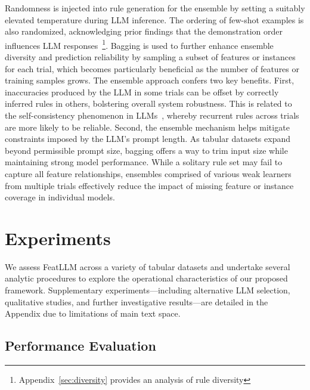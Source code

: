 Randomness is injected into rule generation for the ensemble by setting a suitably elevated temperature during LLM inference. The ordering of few-shot examples is also randomized, acknowledging prior findings that the demonstration order influences LLM responses~\cite{lu2022fantastically}\footnote{Appendix~\ref{sec:diversity} provides an analysis of rule diversity}. Bagging is used to further enhance ensemble diversity and prediction reliability by sampling a subset of features or instances for each trial, which becomes particularly beneficial as the number of features or training samples grows. The ensemble approach confers two key benefits. First, inaccuracies produced by the LLM in some trials can be offset by correctly inferred rules in others, bolstering overall system robustness. This is related to the self-consistency phenomenon in LLMs~\cite{wang2022self}, whereby recurrent rules across trials are more likely to be reliable. Second, the ensemble mechanism helps mitigate constraints imposed by the LLM's prompt length. As tabular datasets expand beyond permissible prompt size, bagging offers a way to trim input size while maintaining strong model performance. While a solitary rule set may fail to capture all feature relationships, ensembles comprised of various weak learners from multiple trials effectively reduce the impact of missing feature or instance coverage in individual models.

\section{Experiments}
We assess \textsf{FeatLLM} across a variety of tabular datasets and undertake several analytic procedures to explore the operational characteristics of our proposed framework. Supplementary experiments—including alternative LLM selection, qualitative studies, and further investigative results—are detailed in the Appendix due to limitations of main text space. 

\subsection{Performance Evaluation}
